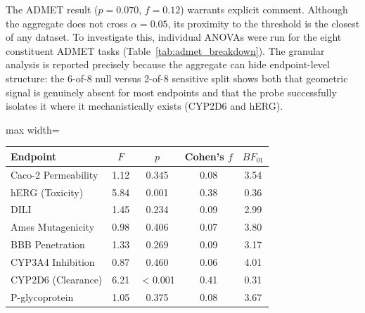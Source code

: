 \documentclass[pdflatex,sn-vancouver-num]{sn-jnl}%
\theoremstyle{thmstyleone}%
\theoremstyle{thmstyletwo}%
\theoremstyle{thmstylethree}%
\renewenvironment{table}[1][htbp]%
{\begin{tableorg}[#1]%
\begin{center}
\begin{adjustbox}{max width=\linewidth}
\begin{threeparttable}
\tablebodyfont%
\renewcommand\footnotetext[2][]{{\removelastskip\vskip3pt%
\let\tablebodyfont\tablefootnotefont%
\hskip0pt\if!##1!\else{\smash{$^{##1}$}}\fi##2\par}}%
}{\end{threeparttable}\end{adjustbox}\end{center}\end{tableorg}}
\begin{document}
The ADMET result ($p = 0.070$, $f = 0.12$) warrants explicit comment.
Although the aggregate does not cross $\alpha = 0.05$, its proximity to the
threshold is the closest of any dataset. To investigate this, individual ANOVAs
were run for the eight constituent ADMET tasks (Table~\ref{tab:admet_breakdown}). The granular analysis is reported precisely because the aggregate can hide endpoint-level structure: the 6-of-8 null versus 2-of-8 sensitive split shows both that geometric signal is genuinely absent for most endpoints and that the probe successfully isolates it where it mechanistically exists (CYP2D6 and hERG).

\begin{table}[htbp]
  \centering
  \caption{Restricted ANOVA (L0--L3) for individual ADMET endpoints. Clearance and Toxicity demonstrate statistically significant geometric sensitivity.}
  \label{tab:admet_breakdown}
  \renewcommand{\arraystretch}{1.2}
  \begin{tabular}{lcccc}
    \toprule
    \textbf{Endpoint} & \textbf{$F$} & \textbf{$p$} & \textbf{Cohen's $f$} & \textbf{$BF_{01}$} \\
    \midrule
    Caco-2 Permeability & 1.12 & 0.345 & 0.08 & 3.54 \\
    hERG (Toxicity) & 5.84 & 0.001 & 0.38 & 0.36 \\
    DILI & 1.45 & 0.234 & 0.09 & 2.99 \\
    Ames Mutagenicity & 0.98 & 0.406 & 0.07 & 3.80 \\
    BBB Penetration & 1.33 & 0.269 & 0.09 & 3.17 \\
    CYP3A4 Inhibition & 0.87 & 0.460 & 0.06 & 4.01 \\
    CYP2D6 (Clearance) & 6.21 & $<$0.001 & 0.41 & 0.31 \\
    P-glycoprotein & 1.05 & 0.375 & 0.08 & 3.67 \\
    \bottomrule
  \end{tabular}
\end{table}
\end{document}
